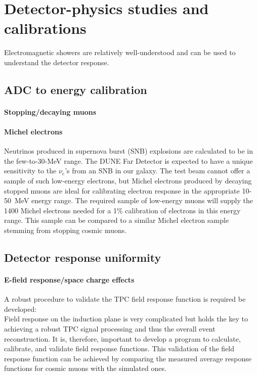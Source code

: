 
\section{Detector-physics studies and calibrations}

Electromagnetic showers are relatively well-understood and can be used to understand the detector response.

	\subsection{ADC to energy calibration}
		\paragraph{Stopping/decaying muons}
		\paragraph{Michel electrons}

Neutrinos produced in supernova burst (SNB) explosions are calculated to be in the few-to-30-MeV range.
The DUNE Far Detector is expected to have a unique sensitivity to the $\nu_e$'s from an SNB in our galaxy.
%
The test beam cannot offer a sample of such low-energy electrons, but Michel electrons produced by decaying stopped muons are ideal for calibrating electron response in the appropriate 10-50~MeV energy range. 
The required  sample of low-energy muons will supply the 1400 Michel electrons needed for a 1\%  calibration of electrons in this energy range. This sample can be compared to a similar Michel electron sample
stemming from stopping cosmic muons.


	\subsection{Detector response uniformity}
		\paragraph{E-field response/space charge effects}
		
		A robust procedure to validate the TPC field response function is required be developed: \\
Field response on the induction plane is very complicated but holds the key to achieving a robust TPC  signal processing and thus the overall event reconstruction. It is, therefore, important to develop a 
program to calculate, calibrate, and validate field response functions. This validation of the field response function can be achieved by comparing the measured average response functions for cosmic muons with the simulated
ones. 

